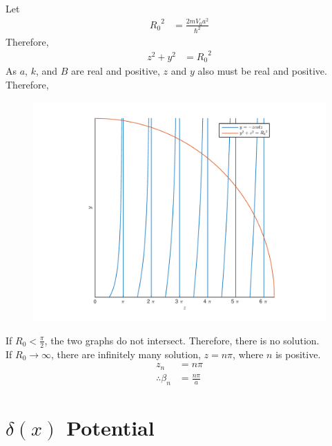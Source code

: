 \documentclass[titlepage, fleqn, a4paper, 12pt, twoside]{article}
\theoremstyle{definition}
\theoremstyle{theorem}
\begin{document}
Let
\begin{align*}
	{R_0}^2 &= \frac{2 m V_0 a^2}{\hbar^2}
\end{align*}
Therefore,
\begin{align*}
	z^2 + y^2 &= {R_0}^2
\end{align*}
As $a$, $k$, and $B$ are real and positive, $z$ and $y$ also must be real and positive.\\
Therefore,
\begin{figure}[H]
	\centering
	\includegraphics[width = \textwidth]{fig-graphical_solution_for_allowed_energy_levels_for_odd_wave_functions_in_finite_potential_well.pdf}
\end{figure}
If $R_0 < \frac{\pi}{2}$, the two graphs do not intersect.
Therefore, there is no solution.\\
If $R_0 \to \infty$, there are infinitely many solution, $z = n \pi$, where $n$ is positive.
\begin{align*}
	z_n &= n \pi\\
	\therefore \beta_n &= \frac{n \pi}{a}
\end{align*}

\section{$\delta(x)$ Potential}
\end{document}
